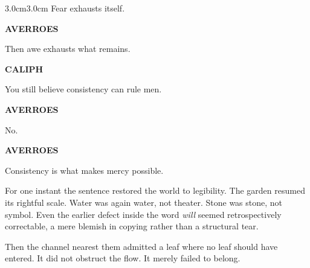 \begin{adjustwidth}{3.0cm}{3.0cm}
Fear exhausts itself.

\medskip

\textbf{AVERROES}

Then awe exhausts what remains.

\medskip

\textbf{CALIPH}

You still believe consistency can rule men.

\medskip

\textbf{AVERROES}

No.

\medskip

\textbf{AVERROES}

Consistency is what makes mercy possible.

\medskip

For one instant the sentence restored the world to legibility. The garden resumed
its rightful scale. Water was again water, not theater. Stone was stone, not symbol.
Even the earlier defect inside the word \textit{will} seemed retrospectively correctable,
a mere blemish in copying rather than a structural tear.

Then the channel nearest them admitted a leaf where no leaf should have entered.
It did not obstruct the flow. It merely failed to belong.

\end{adjustwidth}

\vspace{1em}

